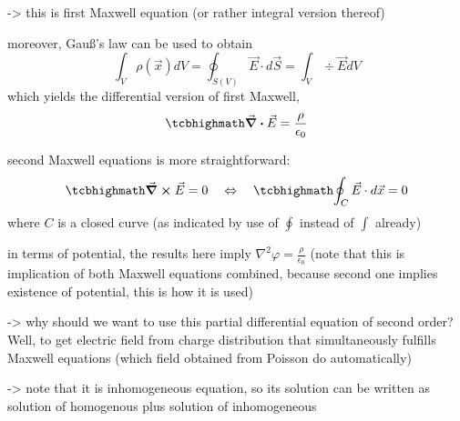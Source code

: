 \documentclass[../class_mech_main.tex]{subfiles}
\begin{document}
-> this is first Maxwell equation (or rather integral version thereof)

moreover, Gauß's law can be used to obtain
\begin{equation*}
    \int_V \rho(\vec{x}) dV = \oint_{S(V)} \vec{E} \cdot d\vec{S} = \int_V \div \vec{E} dV
\end{equation*}
which yields the differential version of first Maxwell,
\begin{equation}
    \eqbox{
        \div \vec{E} = \frac{\rho}{\epsilon_0}
    }
\end{equation}


second Maxwell equations is more straightforward:
\begin{equation}
    \eqbox{
        \curl \vec{E} = 0
    }
    \quad \Leftrightarrow \quad
    \eqbox{
        \oint_C \vec{E} \cdot d\vec{x} = 0
    }
\end{equation}
where $C$ is a closed curve (as indicated by use of $\oint$ instead of $\int$ already)



in terms of potential, the results here imply  $\nabla^2 \varphi = \frac{\rho}{\epsilon_0}$ (note that this is implication of both Maxwell equations combined, because second one implies existence of potential, this is how it is used)

-> why should we want to use this partial differential equation of second order? Well, to get electric field from charge distribution that simultaneously fulfills Maxwell equations (which field obtained from Poisson do automatically)

-> note that it is inhomogeneous equation, so its solution can be written as solution of homogenous plus solution of inhomogeneous
\end{document}

